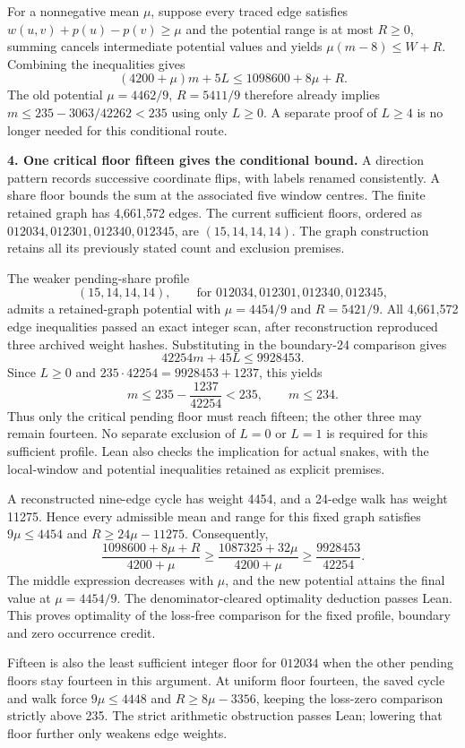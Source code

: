 \documentclass[11pt,a4paper]{article}
\begin{document}
For a nonnegative mean $\mu$, suppose every traced edge satisfies
$w(u,v)+p(u)-p(v)\ge\mu$ and the potential range is at most $R\ge0$,
summing cancels intermediate potential values and yields
$\mu(m-8)\le W+R$. Combining the inequalities gives
\[
\boxed{(4200+\mu)m+5L\le1098600+8\mu+R.}
\]
The old potential $\mu=4462/9$, $R=5411/9$ therefore already implies
$m\le235-3063/42262<235$ using only $L\ge0$.
A separate proof of $L\ge4$ is no longer needed for this conditional route.

\textbf{4. One critical floor fifteen gives the conditional bound.}
A direction pattern records successive coordinate flips, with labels renamed
consistently. A share floor bounds the sum at the associated five window
centres. The finite retained graph has 4,661,572 edges. The current sufficient
floors, ordered as $012034,012301,012340,012345$, are $(15,14,14,14)$.
The graph construction retains all its previously stated count and exclusion
premises.

The weaker pending-share profile
\[
(15,14,14,14),\qquad\text{for }012034,012301,012340,012345,
\]
admits a retained-graph potential with $\mu=4454/9$ and $R=5421/9$.
All 4,661,572 edge inequalities passed an exact integer scan, after
reconstruction reproduced three archived weight hashes. Substituting
in the boundary-24 comparison gives
\[
\boxed{42254m+45L\le9928453.}
\]
Since $L\ge0$ and $235\cdot42254=9928453+1237$, this yields
\[
m\le235-\frac{1237}{42254}<235,\qquad m\le234.
\]
Thus only the critical pending floor must reach fifteen; the other three
may remain fourteen. No separate exclusion of $L=0$ or $L=1$ is required
for this sufficient profile. Lean also checks the implication for actual snakes, with the local-window
and potential inequalities retained as explicit premises.

A reconstructed nine-edge cycle has weight 4454, and a 24-edge walk has
weight 11275. Hence every admissible mean and range for this fixed graph
satisfies $9\mu\le4454$ and $R\ge24\mu-11275$. Consequently,
\[
\frac{1098600+8\mu+R}{4200+\mu}
\ge\frac{1087325+32\mu}{4200+\mu}
\ge\frac{9928453}{42254}.
\]
The middle expression decreases with $\mu$, and the new potential attains
the final value at $\mu=4454/9$. The denominator-cleared optimality
deduction passes Lean. This proves optimality of the loss-free comparison
for the fixed profile, boundary and zero occurrence credit.

Fifteen is also the least sufficient integer floor for $012034$ when the
other pending floors stay fourteen in this argument. At uniform floor
fourteen, the saved cycle and walk force $9\mu\le4448$ and
$R\ge8\mu-3356$, keeping the loss-zero comparison strictly above 235.
The strict arithmetic obstruction passes Lean; lowering that floor further
only weakens edge weights.
\end{document}
